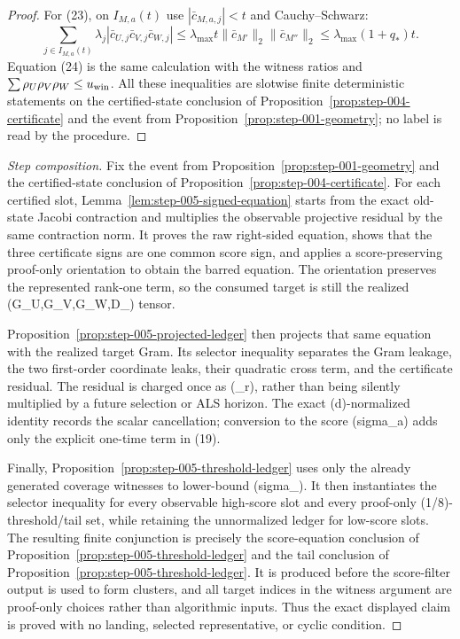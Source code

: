 \begin{proposition}
\begin{proof}
For (23), on $I_{M,a}(t)$ use $|\bar c_{M,a,j}|<t$ and Cauchy--Schwarz:
\[
\sum_{j\in I_{M,a}(t)}\lambda_j|\bar c_{U,j}\bar c_{V,j}\bar c_{W,j}|
\le\lambda_{\max}t\|\bar c_{M'}\|_2\|\bar c_{M''}\|_2
\le\lambda_{\max}(1+q_*)t.
\]
Equation (24) is the same calculation with the witness ratios and
$\sum\rho_U\rho_V\rho_W\le u_{\rm win}$. All these inequalities are
slotwise finite deterministic statements on the certified-state conclusion of Proposition~\ref{prop:step-004-certificate} and the event from Proposition~\ref{prop:step-001-geometry}; no label is
read by the procedure. 

\end{proof}
\end{proposition}
\begin{proof}[Step composition]
Fix the event from Proposition~\ref{prop:step-001-geometry} and the certified-state conclusion of Proposition~\ref{prop:step-004-certificate}.  For each certified slot,
Lemma~\ref{lem:step-005-signed-equation} starts from the exact old-state
Jacobi contraction and multiplies the observable projective residual by the
same contraction norm.  It proves the raw right-sided equation, shows that
the three certificate signs are one common score sign, and applies a
score-preserving proof-only orientation to obtain the barred equation.  The
orientation preserves the represented rank-one term, so the consumed target is
still the realized (G\_U,G\_V,G\_W,D\_\lambda) tensor.

Proposition~\ref{prop:step-005-projected-ledger} then projects that same
equation with the realized target Gram.  Its selector inequality separates
the Gram leakage, the two first-order coordinate leaks, their quadratic cross
term, and the certificate residual.  The residual is charged once as
(\tau\_r), rather than being silently multiplied by a future
selection or ALS horizon.  The exact (d)-normalized identity records the
scalar cancellation; conversion to the score (sigma\_a) adds only the
explicit one-time term in (19).

Finally, Proposition~\ref{prop:step-005-threshold-ledger} uses only the
already generated coverage witnesses to lower-bound (sigma\_{\max}).  It
then instantiates the selector inequality for every observable high-score
slot and every proof-only (1/8)-threshold/tail set, while retaining the unnormalized
ledger for low-score slots.  The resulting finite conjunction is precisely
the score-equation conclusion of Proposition~\ref{prop:step-005-threshold-ledger} and the tail conclusion of Proposition~\ref{prop:step-005-threshold-ledger}.  It is produced before the score-filter output
is used to form clusters, and all target indices in the witness argument are
proof-only choices rather than algorithmic inputs.  Thus the exact displayed
claim is proved with no landing, selected representative, or cyclic
condition.
\end{proof}

